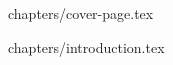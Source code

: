 \documentclass[a4paper,12pt]{article}
\begin{document}
 
 
 
{chapters/cover-page.tex}

\tableofcontents
\clearpage

{chapters/introduction.tex}
 
\end{document}
